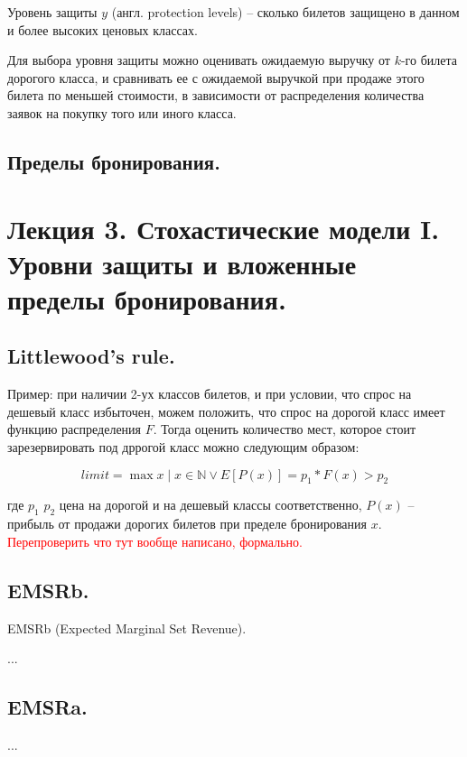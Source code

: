 \documentclass[reqno]{article}
\theoremstyle{definition}
\theoremstyle{definition}
\theoremstyle{definition}
\theoremstyle{definition}
\theoremstyle{definition}
\theoremstyle{definition}
\theoremstyle{definition}
\theoremstyle{definition}
\theoremstyle{definition}
\begin{document}
		Уровень защиты $y$ (англ. protection levels) -- сколько билетов защищено в данном и более высоких ценовых классах.
		
		Для выбора уровня защиты можно оценивать ожидаемую выручку от $k$-го билета дорогого класса, и сравнивать ее с ожидаемой выручкой при продаже этого билета по меньшей стоимости, в зависимости от распределения количества заявок на покупку того или иного класса.
		
		
		\subsection{Пределы бронирования.}
		
		
		
		
		
		\newpage
		\section{Лекция 3. Стохастические модели I. Уровни защиты и вложенные пределы бронирования.}
		
		\subsection{Littlewood's rule.}
		
		Пример: при наличии 2-ух классов билетов, и при условии, что спрос на дешевый класс избыточен, можем положить, что спрос на дорогой класс имеет функцию распределения ${F}$. Тогда оценить количество мест, которое стоит зарезервировать под дррогой класс можно следующим образом:
		
		$$limit = \max x \mid x \in \mathds{N} \vee E[P(x)] = p_1 * F(x) > p_2$$
		
		где $p_1$ $p_2$ цена на дорогой и на дешевый классы соответственно, $P(x)$ -- прибыль от продажи дорогих билетов при пределе бронирования $x$. \textcolor{red}{Перепроверить что тут вообще написано, формально.}
		
		\subsection{EMSRb.}
		
		EMSRb (Expected Marginal Set Revenue).
		
		...
		
		
		\subsection{EMSRa.}
		...
		
\end{document}

